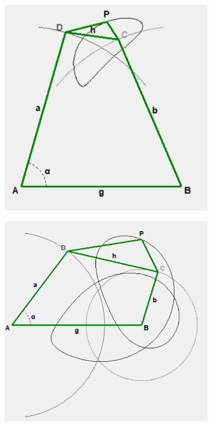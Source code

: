 \documentclass{article}
\begin{document}
\begin{figure}[h]
\begin{subfigure}{0.19\textwidth}
		\caption{}
	\end{subfigure}
	\vfill
	\begin{subfigure}{0.19\textwidth}
		\centering
		\includegraphics[width=\linewidth, height=0.95\linewidth, keepaspectratio]{./Figures/27_motion_cases/-11-1.png}
		\caption{}
	\end{subfigure}
	\hfill
	\begin{subfigure}{0.19\textwidth}
		\centering
		\includegraphics[width=\linewidth, height=0.95\linewidth, keepaspectratio]{./Figures/27_motion_cases/10-1.png}

\end{subfigure}
\end{figure}
\end{document}
